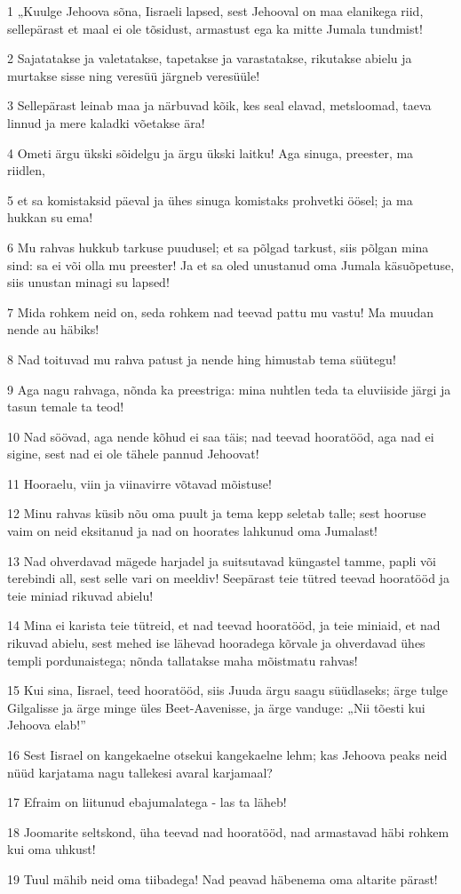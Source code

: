 \par 1 „Kuulge Jehoova sõna, Iisraeli lapsed, sest Jehooval on maa elanikega riid, sellepärast et maal ei ole tõsidust, armastust ega ka mitte Jumala tundmist!
\par 2 Sajatatakse ja valetatakse, tapetakse ja varastatakse, rikutakse abielu ja murtakse sisse ning veresüü järgneb veresüüle!
\par 3 Sellepärast leinab maa ja närbuvad kõik, kes seal elavad, metsloomad, taeva linnud ja mere kaladki võetakse ära!
\par 4 Ometi ärgu ükski sõidelgu ja ärgu ükski laitku! Aga sinuga, preester, ma riidlen,
\par 5 et sa komistaksid päeval ja ühes sinuga komistaks prohvetki öösel; ja ma hukkan su ema!
\par 6 Mu rahvas hukkub tarkuse puudusel; et sa põlgad tarkust, siis põlgan mina sind: sa ei või olla mu preester! Ja et sa oled unustanud oma Jumala käsuõpetuse, siis unustan minagi su lapsed!
\par 7 Mida rohkem neid on, seda rohkem nad teevad pattu mu vastu! Ma muudan nende au häbiks!
\par 8 Nad toituvad mu rahva patust ja nende hing himustab tema süütegu!
\par 9 Aga nagu rahvaga, nõnda ka preestriga: mina nuhtlen teda ta eluviiside järgi ja tasun temale ta teod!
\par 10 Nad söövad, aga nende kõhud ei saa täis; nad teevad hooratööd, aga nad ei sigine, sest nad ei ole tähele pannud Jehoovat!
\par 11 Hooraelu, viin ja viinavirre võtavad mõistuse!
\par 12 Minu rahvas küsib nõu oma puult ja tema kepp seletab talle; sest hooruse vaim on neid eksitanud ja nad on hoorates lahkunud oma Jumalast!
\par 13 Nad ohverdavad mägede harjadel ja suitsutavad küngastel tamme, papli või terebindi all, sest selle vari on meeldiv! Seepärast teie tütred teevad hooratööd ja teie miniad rikuvad abielu!
\par 14 Mina ei karista teie tütreid, et nad teevad hooratööd, ja teie miniaid, et nad rikuvad abielu, sest mehed ise lähevad hooradega kõrvale ja ohverdavad ühes templi pordunaistega; nõnda tallatakse maha mõistmatu rahvas!
\par 15 Kui sina, Iisrael, teed hooratööd, siis Juuda ärgu saagu süüdlaseks; ärge tulge Gilgalisse ja ärge minge üles Beet-Aavenisse, ja ärge vanduge: „Nii tõesti kui Jehoova elab!”
\par 16 Sest Iisrael on kangekaelne otsekui kangekaelne lehm; kas Jehoova peaks neid nüüd karjatama nagu tallekesi avaral karjamaal?
\par 17 Efraim on liitunud ebajumalatega - las ta läheb!
\par 18 Joomarite seltskond, üha teevad nad hooratööd, nad armastavad häbi rohkem kui oma uhkust!
\par 19 Tuul mähib neid oma tiibadega! Nad peavad häbenema oma altarite pärast!


